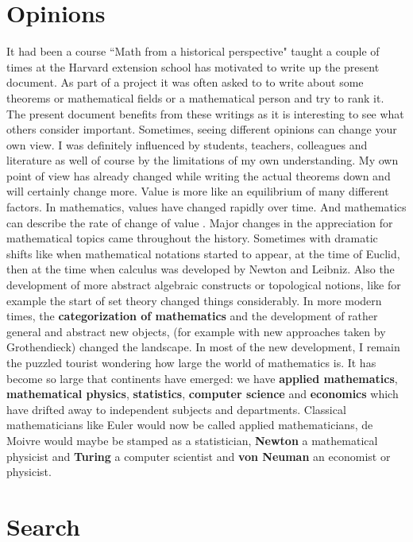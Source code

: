 \documentclass[12pt]{amsart}
\newcounter{example}    \def\example#1{ \item \fontsize{12}{15} \selectfont #1 \fontsize{12}{15} \selectfont }
\begin{document}
\section*{Opinions} 

It had been a course ``Math from a historical perspective" taught a couple of times at
the Harvard extension school has motivated to write up the present document.
As part of a project it was often asked to to write about some theorems or mathematical 
fields or a mathematical person and try to rank it. 
The present document benefits from these writings as it is interesting to see 
what others consider important. Sometimes, seeing different opinions can change your 
own view. I was definitely influenced by students, teachers, colleagues and literature
as well of course by the limitations of my own understanding. 
My own point of view has already changed while writing the actual theorems down and will
certainly change more. Value is more like an equilibrium of many different factors.
In mathematics, values have changed rapidly over time. And mathematics
can describe the rate of change of value \cite{StewartCatastrophe}.
Major changes in the appreciation for mathematical topics came throughout the history.
Sometimes with dramatic shifts like when mathematical notations started to appear, at the time of 
Euclid, then at the time when calculus was developed by Newton and Leibniz. Also the 
development of more abstract algebraic constructs or topological notions, 
like for example the start of set theory changed things considerably. In more modern times,
the {\bf categorization of mathematics} and the development of rather general and
abstract new objects, (for example with new approaches taken by Grothendieck) 
changed the landscape. In most of the new development, I remain the puzzled tourist
wondering how large the world of mathematics is. It has become so large that continents
have emerged: we have {\bf applied mathematics}, {\bf mathematical physics}, {\bf statistics}, 
{\bf computer science} and {\bf economics} which have drifted away to independent subjects
and departments. Classical mathematicians like Euler would now be called applied mathematicians, 
de Moivre would maybe be stamped as a statistician, {\bf Newton} a mathematical physicist
and {\bf Turing} a computer scientist and {\bf von Neuman} an economist or physicist.

\section*{Search} 
\end{document}
